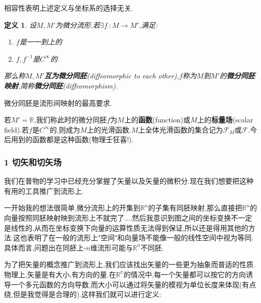 \documentclass[UTF8]{article}
\begin{document}
	相容性表明上述定义与坐标系的选择无关.
	
	\newtheorem*{diffeomorphicToEachOther}{定义}
	
	\begin{diffeomorphicToEachOther}
		
		设$M,M'$为微分流形,若$\exists f~: M \to M'$,满足:
		
		\begin{enumerate}
			
			\item $f$是一一到上的
			
			\item $f,f^{-1}$是$C^{\infty}$的
			
		\end{enumerate}
		
		那么称$M,M'$\textbf{互为微分同胚}(diffeomorphic to each other),$f$称为$M$到$M'$的\textbf{微分同胚映射},简称\textbf{微分同胚}(diffeomorphism).
		
	\end{diffeomorphicToEachOther}
	
	微分同胚是流形间映射的最高要求.
	
	若$M' = \mathbb{R}$,我们称此时的微分同胚$f$为$M$上的\textbf{函数}(function)或$M$上的\textbf{标量场}(scalar field).若$f$是$C^{\infty}$的,则成为$M$上的光滑函数.$M$上全体光滑函数的集合记为$\mathscr{F}_{M}$或$\mathscr{F}$.今后用到的函数都是这种函数(物理壬狂喜!).
	
	
	
	
	
	\newpage
	
\subsubsection*{1 切矢和切矢场}
	
	我们在普物的学习中已经充分掌握了矢量以及矢量的微积分.现在我们想要把这种有用的工具推广到流形上.
	
	一开始我的想法很简单,微分流形上的开集到$\mathbb{R}^n$的子集有同胚映射,那么直接把$\mathbb{R}^n$的向量按照同胚映射映到流形上不就完了....然后我意识到图之间的坐标变换不一定是线性的,从而在坐标变换下向量的运算性质无法得到保证,所以还是得用其他的方法.这也表明了在一般的流形上"空间"和向量场不能像一般的线性空间中视为等同.具体而言,问题出在同胚上-$n$维流形可能与$\mathbb{R}^n$不同胚.
	
	为了把矢量的概念推广到流形上,我们应该找出矢量的一些更为抽象而普适的性质.物理上,矢量是有大小,有方向的量.在$\mathbb{R^n}$的情况中,每一个矢量都可以按它的方向诱导一个多元函数的方向导数,而大小可以通过将矢量的模视为单位长度来体现(有点绕,但是我觉得是合理的).这样我们就可以进行定义:
	
\end{document}
